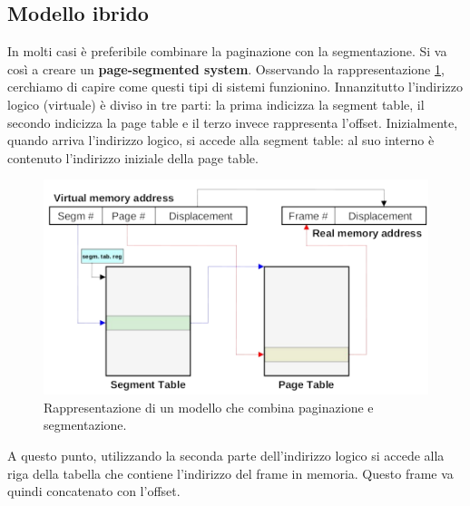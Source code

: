 \subsection{Modello ibrido}
In molti casi è preferibile combinare la paginazione con la segmentazione. Si va così a creare un \textbf{page-segmented system}. Osservando la rappresentazione \ref{fig:page-segmented_system}, cerchiamo di capire come questi tipi di sistemi funzionino. Innanzitutto l'indirizzo logico (virtuale) è diviso in tre parti: la prima indicizza la segment table, il secondo indicizza la page table e il terzo invece rappresenta l'offset. Inizialmente, quando arriva l'indirizzo logico, si accede alla segment table: al suo interno è contenuto l'indirizzo iniziale della page table.
\begin{figure}[h]
    \centering
    \includegraphics[width = .7\textwidth]{../res/imgs/main memory/page-segmented_system.png}
    \caption{Rappresentazione di un modello che combina paginazione e segmentazione.}
    \label{fig:page-segmented_system}
\end{figure}
A questo punto, utilizzando la seconda parte dell'indirizzo logico si accede alla riga della tabella che contiene l'indirizzo del frame in memoria. Questo frame va quindi concatenato con l'offset.

